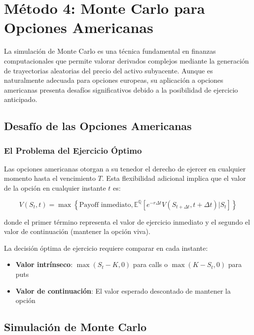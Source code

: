 
\chapter{Método 4: Monte Carlo para Opciones Americanas}
\label{chapter:metodo_montecarlo}

La simulación de Monte Carlo es una técnica fundamental en finanzas computacionales que permite valorar derivados complejos mediante la generación de trayectorias aleatorias del precio del activo subyacente. Aunque es naturalmente adecuada para opciones europeas, su aplicación a opciones americanas presenta desafíos significativos debido a la posibilidad de ejercicio anticipado.

\section{Desafío de las Opciones Americanas}

\subsection{El Problema del Ejercicio Óptimo}

Las opciones americanas otorgan a su tenedor el derecho de ejercer en cualquier momento hasta el vencimiento $T$. Esta flexibilidad adicional implica que el valor de la opción en cualquier instante $t$ es:

\begin{equation}
V(S_t, t) = \max\left\{\text{Payoff inmediato}, \mathbb{E}^{\mathbb{Q}}[e^{-r\Delta t} V(S_{t+\Delta t}, t+\Delta t) | S_t]\right\}
\end{equation}

donde el primer término representa el valor de ejercicio inmediato y el segundo el valor de continuación (mantener la opción viva).

La decisión óptima de ejercicio requiere comparar en cada instante:
\begin{itemize}
    \item \textbf{Valor intrínseco}: $\max(S_t - K, 0)$ para calls o $\max(K - S_t, 0)$ para puts
    \item \textbf{Valor de continuación}: El valor esperado descontado de mantener la opción
\end{itemize}

\section{Simulación de Monte Carlo}

